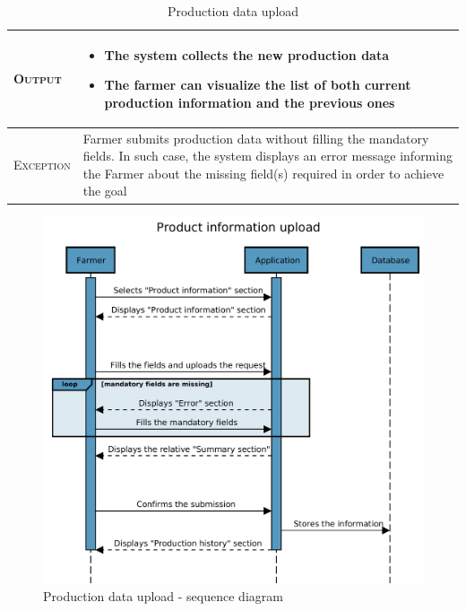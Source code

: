 \begin{table}[H]
\begin{tabular}[c]{|l|p{}|}
    	\hline %
    	\textsc{Output}             &  \begin{itemize}
    	    \item The system collects the new production data
    	    \item The farmer can visualize the list of both current production information and the previous ones
    	\end{itemize}\\
    	\hline %
    	\textsc{Exception}         &  Farmer submits production data without filling the mandatory fields. In such case, the system displays an error message informing the Farmer about the missing field(s) required in order to achieve the goal\\
    	\hline %
        
    \end{tabular}
    \caption{\label{tab:Production_data_submission}Production data upload}
\end{table}


\begin{figure}[H]
	\centering
    \includegraphics[page=1, width=\textwidth]{Images/SeqDiag/product_info_upload_seq_diag.pdf}
	\caption{\label{fig:product_info_seq_diag}Production data upload - sequence diagram}
\end{figure}


